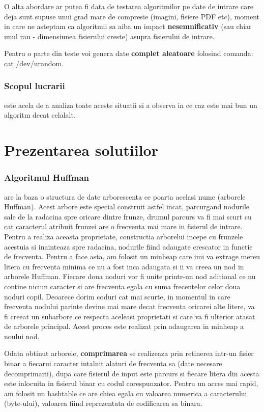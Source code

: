 \documentclass[runningheads]{llncs}
\begin{document}
O alta abordare ar putea fi data de testarea algoritmilor pe date de intrare care deja sunt
supuse unui grad mare de compresie (imagini, fisiere PDF etc), moment in care ne asteptam ca
algoritmii sa aiba un impact \textbf{nesemnificativ} (sau chiar unul rau - dimensiunea fisierului creste)
asupra fisierului de intrare.

Pentru o parte din teste voi genera date \textbf{complet aleatoare} folosind comanda:
cat /dev/urandom.

\subsubsection{Scopul lucrarii} este acela de a analiza toate aceste situatii si a observa
in ce caz este mai bun un algoritm decat celalalt.



\section{Prezentarea solutiilor}
\subsubsection{Algoritmul Huffman} are la baza o structura de date arborescenta ce poarta acelasi
nume (arborele Huffman). Acest arbore este special construit astfel incat, parcurgand nodurile sale
de la radacina spre oricare dintre frunze, drumul parcurs va fi mai scurt cu cat caracterul atribuit
frunzei are o frecventa mai mare in fisierul de intrare. Pentru a realiza aceasta proprietate, constructia
arborelui incepe cu frunzele acestuia si inainteaza spre radacina, nodurile fiind adaugate crescator in functie
de frecventa. Pentru a face asta, am folosit un minheap care imi va extrage mereu litera cu frecventa minima
ce nu a fost inca adaugata si ii va creea un nod in arborele Huffman. Fiecare doua noduri vor fi unite printr-un
nod aditional ce nu contine niciun caracter si are frecventa egala cu suma frecentelor celor doua noduri copil.
Deoarece dorim coduri cat mai scurte, in momentul in care frecventa nodului parinte devine mai mare decat frecventa
oricarei alte litere, va fi creeat un subarbore ce respecta aceleasi proprietati si care va fi ulterior atasat de
arborele principal.
Acest proces este realizat prin adaugarea in minheap a noului nod.

Odata obtinut arborele, \textbf{comprimarea} se realizeaza prin retinerea intr-un fisier binar a fiecarui caracter intalnit alaturi de frecventa sa (date necesare decomprimarii),
dupa care fisierul de input este parcurs si fiecare litera din acesta este inlocuita in fisierul binar cu codul corespunzator.
Pentru un acces mai rapid, am folosit un hashtable ce are chiea egala cu valoarea numerica a caracterului (byte-ului),
valoarea fiind reprezentata de codificarea sa binara.
\end{document}
